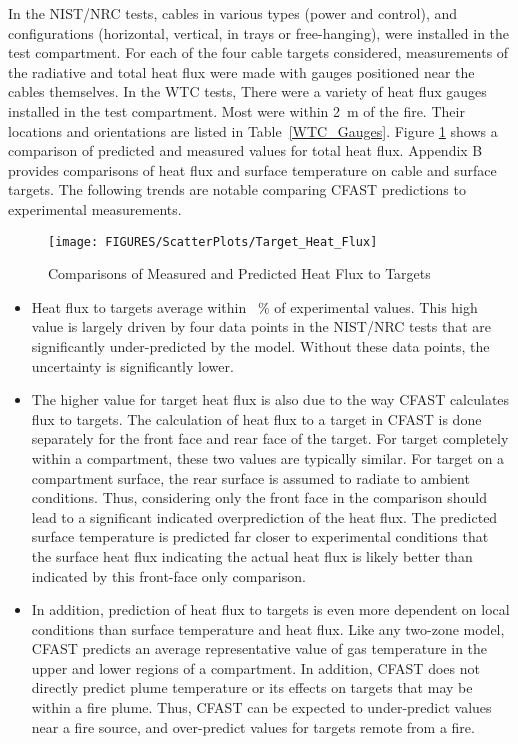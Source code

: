 In the NIST/NRC tests, cables in various types (power and control), and configurations (horizontal, vertical, in trays or free-hanging), were installed in the test compartment. For each of the four cable targets considered, measurements of the radiative and total heat flux were made with gauges positioned near the cables themselves.  In the WTC tests, There were a variety of heat flux gauges installed in the test compartment. Most were within 2~m of the fire. Their locations and orientations are listed in Table~\ref{WTC_Gauges}. Figure \ref{fig:Target_Flux_Scatter} shows a comparison of predicted and measured values for total heat flux. Appendix B provides comparisons of heat flux and surface temperature on cable and surface targets.  The following trends are notable comparing CFAST predictions to experimental measurements.
\label{Surface Heat Flux}
\label{Wall Heat Flux}
\label{Ceiling Heat Flux}
\label{Floor Heat Flux}

\begin{figure}
\begin{center}
\texttt{[image: FIGURES/ScatterPlots/Target\_Heat\_Flux]}
\end{center}
\caption{Comparisons of Measured and Predicted Heat Flux to Targets} \label{fig:Target_Flux_Scatter}
\end{figure}

\begin{itemize}
\item Heat flux to targets average within \Targfluxavg ~\% of experimental values. This high value is largely driven by four data points in the NIST/NRC tests that are significantly under-predicted by the model.  Without these data points, the uncertainty is significantly lower.
\item The higher value for target heat flux is also due to the way CFAST calculates flux to targets.  The calculation of heat flux to a target in CFAST is done separately for the front face and rear face of the target.  For target completely within a compartment, these two values are typically similar.  For target on a compartment surface, the rear surface is assumed to radiate to ambient conditions.  Thus, considering only the front face in the comparison should lead to a significant indicated overprediction of the heat flux. The predicted surface temperature is predicted far closer to experimental conditions that the surface heat flux indicating the actual heat flux is likely better than indicated by this front-face only comparison.
\item  In addition, prediction of heat flux to targets is even more dependent on local conditions than surface temperature and heat flux.  Like any two-zone model, CFAST predicts an average representative value of gas temperature in the upper and lower regions of a compartment.  In addition, CFAST does not directly predict plume temperature or its effects on targets that may be within a fire plume.  Thus, CFAST can be expected to under-predict values near a fire source, and over-predict values for targets remote from a fire.
\end{itemize}
